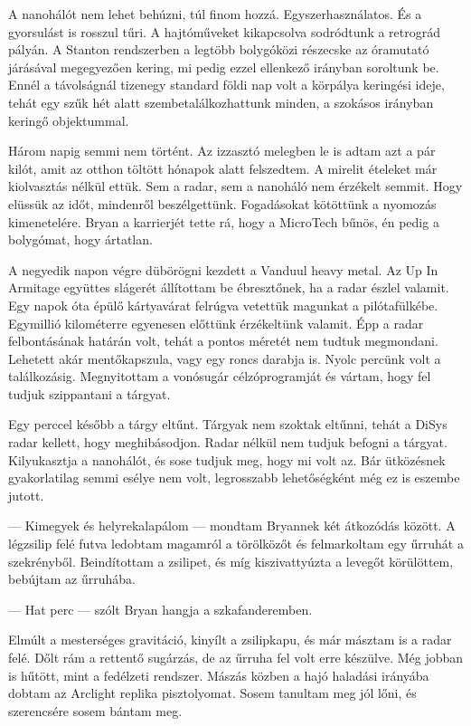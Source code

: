 \documentclass[10pt]{memoir}
\begin{document}
A nanohálót nem lehet behúzni, túl finom hozzá. Egyszerhasználatos. És a
gyorsulást is rosszul tűri. A hajtóműveket kikapcsolva sodródtunk a retrográd
pályán. A Stanton rendszerben a legtöbb bolygóközi részecske az óramutató
járásával megegyezően kering, mi pedig ezzel ellenkező irányban soroltunk be.
Ennél a távolságnál tizenegy standard földi nap volt a körpálya keringési
ideje, tehát egy szűk hét alatt szembetalálkozhattunk minden, a szokásos
irányban keringő objektummal.

Három napig semmi nem történt. Az izzasztó melegben le is adtam azt a pár
kilót, amit az otthon töltött hónapok alatt felszedtem. A mirelit ételeket már
kiolvasztás nélkül ettük. Sem a radar, sem a nanoháló nem érzékelt semmit. Hogy
elüssük az időt, mindenről beszélgettünk. Fogadásokat kötöttünk a nyomozás
kimenetelére. Bryan a karrierjét tette rá, hogy a MicroTech bűnös, én pedig a
bolygómat, hogy ártatlan.

A negyedik napon végre dübörögni kezdett a Vanduul heavy metal. Az Up In
Armitage együttes slágerét állítottam be ébresztőnek, ha a radar észlel
valamit. Egy napok óta épülő kártyavárat felrúgva vetettük magunkat a
pilótafülkébe. Egymillió kilométerre egyenesen előttünk érzékeltünk valamit.
Épp a radar felbontásának határán volt, tehát a pontos méretét nem tudtuk
megmondani. Lehetett akár mentőkapszula, vagy egy roncs darabja is. Nyolc
percünk volt a találkozásig. Megnyitottam a vonósugár célzóprogramját és
vártam, hogy fel tudjuk szippantani a tárgyat.

Egy perccel később a tárgy eltűnt. Tárgyak nem szoktak eltűnni, tehát a DiSys
radar kellett, hogy meghibásodjon. Radar nélkül nem tudjuk befogni a tárgyat.
Kilyukasztja a nanohálót, és sose tudjuk meg, hogy mi volt az. Bár ütközésnek
gyakorlatilag semmi esélye nem volt, legrosszabb lehetőségként még ez is
eszembe jutott.

— Kimegyek és helyrekalapálom — mondtam Bryannek két átkozódás között. A
légzsilip felé futva ledobtam magamról a törölközőt és felmarkoltam egy űrruhát
a szekrényből. Beindítottam a zsilipet, és míg kiszivattyúzta a levegőt
körülöttem, bebújtam az űrruhába.

— Hat perc — szólt Bryan hangja a szkafanderemben.

Elmúlt a mesterséges gravitáció, kinyílt a zsilipkapu, és már másztam is a
radar felé. Dőlt rám a rettentő sugárzás, de az űrruha fel volt erre készülve.
Még jobban is hűtött, mint a fedélzeti rendszer. Mászás közben a hajó haladási
irányába dobtam az Arclight replika pisztolyomat. Sosem tanultam meg jól lőni,
és szerencsére sosem bántam meg.
\end{document}
